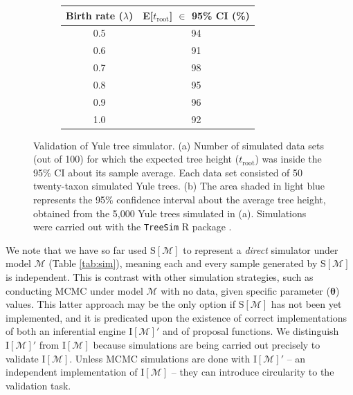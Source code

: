 \documentclass[oneside]{article}
\begin{document}
\begin{figure}
  \centering
  \vspace{0pt}
  \begin{subfigure}[t]{0.5\textwidth}
    \caption{}
    \centering
    \begin{tabular}{ c|c }
    \hline
    Birth rate ($\lambda$) & E[$t_{\text{root}}$] $\in$ 95\% CI (\%)\\
    \hline  
    0.5 & 94\\
    0.6 & 91\\
    0.7 & 98\\
    0.8 & 95\\
    0.9 & 96\\
    1.0 & 92\\
    \hline
  \end{tabular}
  \end{subfigure}
  \vspace{0pt}
  \hspace{1cm}
  \begin{subfigure}[t]{0.4\textwidth}
    \caption{}
    \centering
        
  \end{subfigure}
  \hfill
  \caption{Validation of Yule tree simulator.
    (a) Number of simulated data sets (out of 100) for which the
    expected tree height ($t_{\text{root}}$) was inside the 95\% CI
    about its sample average.
    Each data set consisted of 50 twenty-taxon simulated Yule trees.
    (b) The area shaded in light blue represents the
    95\% confidence interval about the average tree height, obtained
    from the 5,000 Yule trees simulated in (a). Simulations were
    carried out with the \texttt{TreeSim} R package \citep{stadler11}.}
  \label{fig:yulemean}
\end{figure}

We note that we have so far used $\text{S}[\mathcal{M}]$ to represent a \emph{direct} simulator
under model $\mathcal{M}$ (Table \ref{tab:sim}), meaning each and every sample
generated by $\text{S}[\mathcal{M}]$ is
independent.
This is contrast with other simulation strategies, such as conducting
MCMC under model $\mathcal{M}$ with no data, given specific parameter
($\boldsymbol{\theta}$) values.
This latter approach may be the only option if $\text{S}[\mathcal{M}]$ has not
been yet implemented, and it is predicated upon the existence of correct
implementations of both an inferential engine $\text{I}[\mathcal{M}]'$ and of
proposal functions.
We distinguish $\text{I}[\mathcal{M}]'$ from $\text{I}[\mathcal{M}]$ because
simulations are being carried out precisely to validate $\text{I}[\mathcal{M}]$.
Unless MCMC simulations are done with $\text{I}[\mathcal{M}]'$ -- an independent
implementation of $\text{I}[\mathcal{M}]$ -- they can introduce circularity 
to the validation task.
\end{document}

